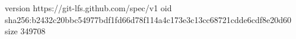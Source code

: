 version https://git-lfs.github.com/spec/v1
oid sha256:b2432c20bbc54977bdf1fd66d78f114a4c173e3c13cc68721cdde6cdf8e20d60
size 349708
